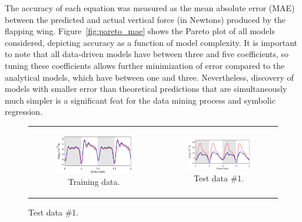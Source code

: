 \documentclass{article}
\begin{document}
The accuracy of each equation was measured as the mean absolute error (MAE)
between the predicted and actual vertical force (in Newtons) produced by the
flapping wing.  Figure~\ref{fig:pareto_mae} shows the Pareto plot of all models
considered, depicting accuracy as a function of model complexity. It is
important to note that all data-driven models have between three and five
coefficients, so tuning these coefficients allows further minimization of error
compared to the analytical models, which have between one and three.
Nevertheless, discovery of models with smaller error than theoretical
predictions that are simultaneously much simpler is a significant feat for the
data mining process and symbolic regression.

\begin{figure}[ht]
\centering
\begin{tabular}{cc}
\begin{subfigure}{0.48\textwidth}
\centering
\includegraphics[width=\textwidth]{figures/eq_goodbad_1}
\caption{\label{fig:eq_goodbad_1} Training data.}
\end{subfigure} &
\begin{subfigure}{0.48\textwidth}
\centering
\includegraphics[width=\textwidth]{figures/eq_goodbad_2}
\caption{\label{fig:eq_goodbad_2} Test data \#1.}

\end{subfigure}
\end{tabular}
\end{figure}
\end{document}
